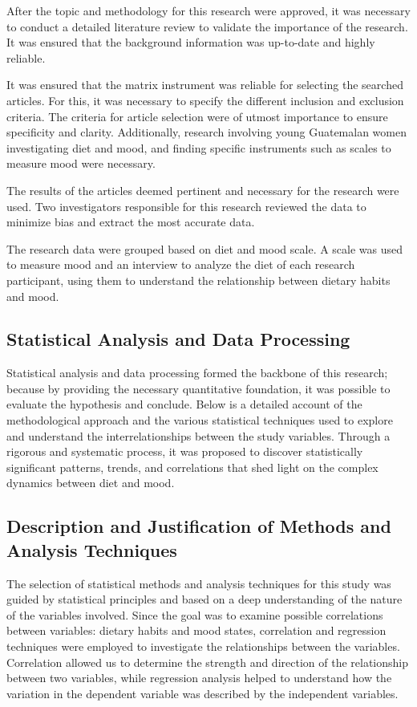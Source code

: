 \documentclass[jou]{apa7}
\begin{document}
After the topic and methodology for this research were approved, it was necessary to conduct a detailed literature review to validate the importance of the research. It was ensured that the background information was up-to-date and highly reliable.

It was ensured that the matrix instrument was reliable for selecting the searched articles. For this, it was necessary to specify the different inclusion and exclusion criteria. The criteria for article selection were of utmost importance to ensure specificity and clarity. Additionally, research involving young Guatemalan women investigating diet and mood, and finding specific instruments such as scales to measure mood were necessary.

The results of the articles deemed pertinent and necessary for the research were used. Two investigators responsible for this research reviewed the data to minimize bias and extract the most accurate data.

The research data were grouped based on diet and mood scale. A scale was used to measure mood and an interview to analyze the diet of each research participant, using them to understand the relationship between dietary habits and mood.


\subsection{Statistical Analysis and Data Processing}

Statistical analysis and data processing formed the backbone of this research; because by providing the necessary quantitative foundation, it was possible to evaluate the hypothesis and conclude. Below is a detailed account of the methodological approach and the various statistical techniques used to explore and understand the interrelationships between the study variables. Through a rigorous and systematic process, it was proposed to discover statistically significant patterns, trends, and correlations that shed light on the complex dynamics between diet and mood.


\subsection{Description and Justification of Methods and Analysis Techniques}\label{descripciuxf3n-y-justificaciuxf3n-de-muxe9todos-y-tuxe9cnicas-de-anuxe1lisis}

The selection of statistical methods and analysis techniques for this study was guided by statistical principles and based on a deep understanding of the nature of the variables involved. Since the goal was to examine possible correlations between variables: dietary habits and mood states, correlation and regression techniques were employed to investigate the relationships between the variables. Correlation allowed us to determine the strength and direction of the relationship between two variables, while regression analysis helped to understand how the variation in the dependent variable was described by the independent variables.\\
\end{document}
